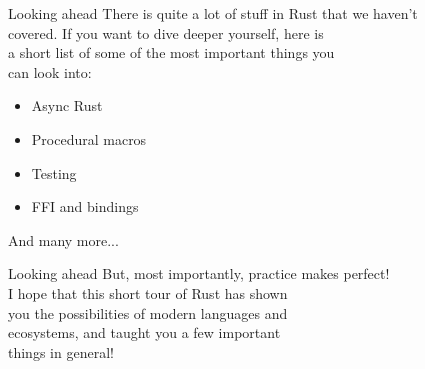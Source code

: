 \documentclass[usenames,dvipsnames,10pt,aspectratio=169]{beamer}
\begin{document}
\begin{frame}{Looking ahead}
	\large
There is quite a lot of stuff in Rust that we haven't\\
covered. If you want to dive deeper yourself, here is\\
a short list of some of the most important things you\\
can look into:
\vspace{0.2cm}
\begin{itemize}[label=$\bullet$]
	\item Async Rust
	\item Procedural macros
	\item Testing
	\item FFI and bindings
\end{itemize}
\vspace{0.2cm}
And many more...
\end{frame}

\begin{frame}{Looking ahead}
\Large
But, most importantly, practice makes perfect!\\

\vspace{0.4cm}
I hope that this short tour of Rust has shown\\
you the possibilities of modern languages and\\
ecosystems, and taught you a few important\\
things in general!
\end{frame}

\end{document}

